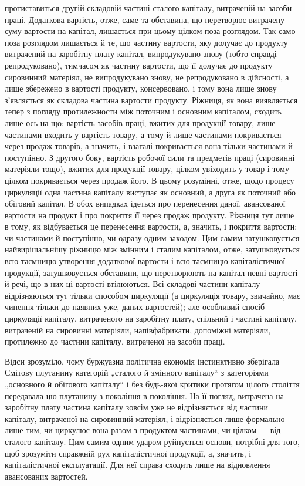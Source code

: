 \parcont{}  %
протиставиться другій складовій частині сталого капіталу, витраченій на
засоби праці. Додаткова вартість, отже, саме та обставина, що перетворює
витрачену суму вартости на капітал, лишається при цьому цілком
поза розглядом. Так само поза розглядом лишається й те, що частину
вартости, яку долучає до продукту витрачений на заробітну плату капітал,
випродукувано знову (тобто справді репродуковано), тимчасом як
частину вартости, що її долучає до продукту сировинний матеріял, не
випродукувано знову, не репродуковано в дійсності, а лише збережено
в вартості продукту, консервовано, і тому вона лише знову з’являється як
складова частина вартости продукту. Ріжниця, як вона виявляється тепер
з погляду протилежности між поточним і основним капіталом, сходить
лише ось на що: вартість засобів праці, вжитих для продукції товару,
лише частинами входить у вартість товару, а тому й лише частинами
покривається через продаж товарів, а значить, і взагалі покривається вона
тільки частинами й поступінно. З другого боку, вартість робочої
сили та предметів праці (сировинні матеріяли тощо), вжитих для
продукції товару, цілком увіходить у товар і тому цілком покривається
через продаж його. В цьому розумінні, отже, щодо процесу
циркуляції одна частина капіталу виступає як основний, а друга як поточний
або обіговий капітал. В обох випадках ідеться про перенесення
даної, авансованої вартости на продукт і про покриття її через продаж
продукту. Ріжниця тут лише в тому, як відбувається це перенесення вартости,
а, значить, і покриття вартости: чи частинами й поступінно, чи
одразу одним заходом. Цим самим затушковується найвирішальнішу ріжницю
між змінним і сталим капіталом, отже, затушковується всю таємницю
утворення додаткової вартости і всю таємницю капіталістичної продукції,
затушковується обставини, що перетворюють на капітал певні вартості
й речі, що в них ці вартості втілюються. Всі складові частини капіталу
відрізняються тут тільки способом циркуляції (а циркуляція товару,
звичайно, має чинення тільки до наявних уже, даних вартостей); але особливий
спосіб циркуляції капіталу, витраченого на заробітну плату, спільний і
частині капіталу, витраченій на сировинні матеріяли, напівфабрикати,
допоміжні матеріяли, протилежно до частини капіталу, витраченої на засоби
праці.

Відси зрозуміло, чому буржуазна політична економія інстинктивно
зберігала Смітову плутанину категорій „сталого й змінного капіталу“
з категоріями „основного й обігового капіталу“ і без будь-якої критики
протягом цілого століття передавала цю плутанину з покоління в покоління.
На її погляд, витрачена на заробітну плату частина капіталу зовсім
уже не відрізняється від частини капіталу, витраченої на сировинний
матеріял, і відрізняється лише формально — лише тим, чи циркулює вона
разом з продуктом частинами, чи цілком — від сталого капіталу. Цим
самим одним ударом руйнується основи, потрібні для того, щоб зрозуміти
справжній рух капіталістичної продукції, а, значить, і капіталістичної
експлуатації. Для неї справа сходить лише на відновлення авансованих
вартостей.
